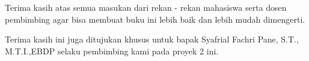 Terima kasih atas semua masukan dari rekan - rekan mahasiswa serta dosen pembimbing agar bisa membuat buku ini 
lebih baik dan lebih mudah dimengerti.

Terima kasih ini juga ditujukan khusus untuk bapak Syafrial Fachri Pane,  S.T.,  M.T.I.,EBDP selaku pembimbing kami pada proyek 2 ini.
